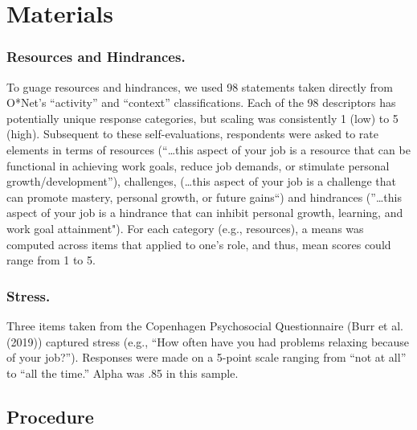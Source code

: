 \documentclass[
  english,
  man]{apa6}
\begin{document}
\hypertarget{materials}{%
\section{Materials}\label{materials}}

\hypertarget{resources-and-hindrances.}{%
\subsubsection{Resources and Hindrances.}\label{resources-and-hindrances.}}

To guage resources and hindrances, we used 98 statements taken directly from O*Net's ``activity'' and ``context'' classifications. Each of the 98 descriptors has potentially unique response categories, but scaling was consistently 1 (low) to 5 (high). Subsequent to these self-evaluations, respondents were asked to rate elements in terms of resources (``\ldots this aspect of your job is a resource that can be functional in achieving work goals, reduce job demands, or stimulate personal growth/development''), challenges, (\ldots this aspect of your job is a challenge that can promote mastery, personal growth, or future gains``) and hindrances (''\ldots this aspect of your job is a hindrance that can inhibit personal growth, learning, and work goal attainment"). For each category (e.g., resources), a means was computed across items that applied to one's role, and thus, mean scores could range from 1 to 5.

\hypertarget{stress.}{%
\subsubsection{Stress.}\label{stress.}}

Three items taken from the Copenhagen Psychosocial Questionnaire (Burr et al. (2019)) captured stress (e.g., ``How often have you had problems relaxing because of your job?''). Responses were made on a 5-point scale ranging from ``not at all'' to ``all the time.'' Alpha was .85 in this sample.

\hypertarget{procedure}{%
\subsection{Procedure}\label{procedure}}
\end{document}
